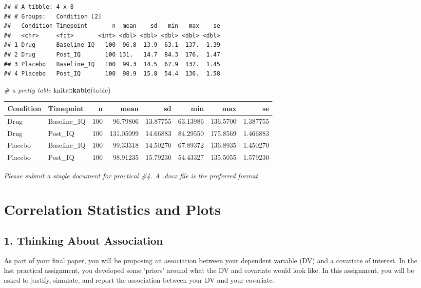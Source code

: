 \documentclass[
]{book}
\newenvironment{Shaded}{\begin{snugshade}}{\end{snugshade}}
\newcommand{\CommentTok}[1]{\textcolor[rgb]{0.56,0.35,0.01}{\textit{#1}}}
\newcommand{\FunctionTok}[1]{\textcolor[rgb]{0.13,0.29,0.53}{\textbf{#1}}}
\newcommand{\NormalTok}[1]{#1}
\newcommand{\SpecialCharTok}[1]{\textcolor[rgb]{0.81,0.36,0.00}{\textbf{#1}}}
\begin{document}
\begin{verbatim}
## # A tibble: 4 x 8
## # Groups:   Condition [2]
##   Condition Timepoint       n  mean    sd   min   max    se
##   <chr>     <fct>       <int> <dbl> <dbl> <dbl> <dbl> <dbl>
## 1 Drug      Baseline_IQ   100  96.8  13.9  63.1  137.  1.39
## 2 Drug      Post_IQ       100 131.   14.7  84.3  176.  1.47
## 3 Placebo   Baseline_IQ   100  99.3  14.5  67.9  137.  1.45
## 4 Placebo   Post_IQ       100  98.9  15.8  54.4  136.  1.58
\end{verbatim}

\begin{Shaded}
\begin{Highlighting}[]
\CommentTok{\# a pretty table }
\NormalTok{knitr}\SpecialCharTok{::}\FunctionTok{kable}\NormalTok{(table)}
\end{Highlighting}
\end{Shaded}

\begin{tabular}{l|l|r|r|r|r|r|r}
\hline
Condition & Timepoint & n & mean & sd & min & max & se\\
\hline
Drug & Baseline\_IQ & 100 & 96.79806 & 13.87755 & 63.13986 & 136.5700 & 1.387755\\
\hline
Drug & Post\_IQ & 100 & 131.05099 & 14.66883 & 84.29550 & 175.8569 & 1.466883\\
\hline
Placebo & Baseline\_IQ & 100 & 99.33318 & 14.50270 & 67.89372 & 136.8935 & 1.450270\\
\hline
Placebo & Post\_IQ & 100 & 98.91235 & 15.79230 & 54.43327 & 135.5055 & 1.579230\\
\hline
\end{tabular}

\emph{Please submit a single document for practical \#4. A .docx file is the preferred format.}

\chapter{Correlation Statistics and Plots}\label{correlation-statistics-and-plots}

\section*{1. Thinking About Association}\label{thinking-about-association}

As part of your final paper, you will be proposing an association between your dependent variable (DV) and a covariate of interest. In the last practical assignment, you developed some `priors' around what the DV and covariate would look like. In this assignment, you will be asked to justify, simulate, and report the association between your DV and your covariate.
\end{document}
